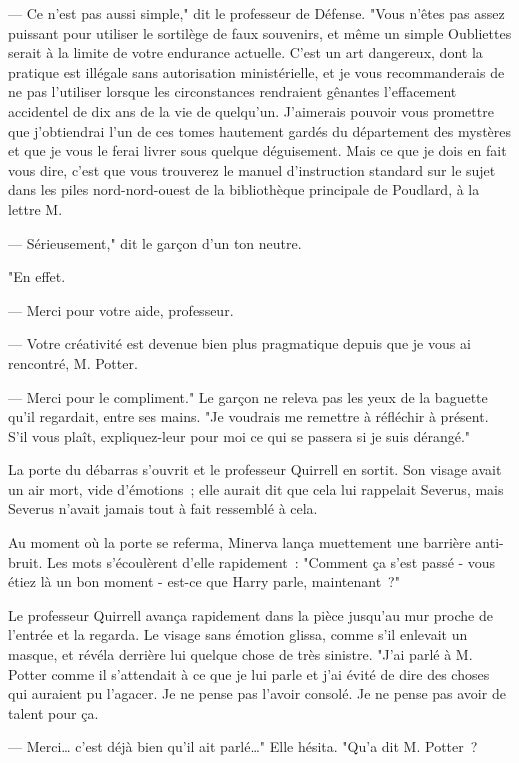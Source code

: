 --- Ce n'est pas aussi simple," dit le professeur de Défense. "Vous n'êtes pas assez puissant pour utiliser le sortilège de faux souvenirs, et même un simple Oubliettes serait à la limite de votre endurance actuelle. C'est un art dangereux, dont la pratique est illégale sans autorisation ministérielle, et je vous recommanderais de ne pas l'utiliser lorsque les circonstances rendraient gênantes l'effacement accidentel de dix ans de la vie de quelqu'un. J'aimerais pouvoir vous promettre que j'obtiendrai l'un de ces tomes hautement gardés du département des mystères et que je vous le ferai livrer sous quelque déguisement. Mais ce que je dois en fait vous dire, c'est que vous trouverez le manuel d'instruction standard sur le sujet dans les piles nord-nord-ouest de la bibliothèque principale de Poudlard, à la lettre M.

--- Sérieusement," dit le garçon d'un ton neutre.

"En effet.

--- Merci pour votre aide, professeur.

--- Votre créativité est devenue bien plus pragmatique depuis que je vous ai rencontré, M. Potter.

--- Merci pour le compliment." Le garçon ne releva pas les yeux de la baguette qu'il regardait, entre ses mains. "Je voudrais me remettre à réfléchir à présent. S'il vous plaît, expliquez-leur pour moi ce qui se passera si je suis dérangé."

\later

La porte du débarras s'ouvrit et le professeur Quirrell en sortit. Son visage avait un air mort, vide d'émotions~; elle aurait dit que cela lui rappelait Severus, mais Severus n'avait jamais tout à fait ressemblé à cela.

Au moment où la porte se referma, Minerva lança muettement une barrière anti-bruit. Les mots s'écoulèrent d'elle rapidement~: "Comment ça s'est passé - vous étiez là un bon moment - est-ce que Harry parle, maintenant~?"

Le professeur Quirrell avança rapidement dans la pièce jusqu'au mur proche de l'entrée et la regarda. Le visage sans émotion glissa, comme s'il enlevait un masque, et révéla derrière lui quelque chose de très sinistre. "J'ai parlé à M. Potter comme il s'attendait à ce que je lui parle et j'ai évité de dire des choses qui auraient pu l'agacer. Je ne pense pas l'avoir consolé. Je ne pense pas avoir de talent pour ça.

--- Merci… c'est déjà bien qu'il ait parlé…" Elle hésita. "Qu'a dit M. Potter~?

